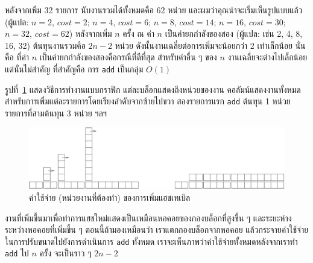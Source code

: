 หลังจากเพิ่ม 32 รายการ นับงานรวมได้ทั้งหมดคือ 62 หน่วย และผมว่าคุณน่าจะเริ่มเห็นรูปแบบแล้ว
(ผู้แปล: {\scriptsize$n = 2$}, {\scriptsize$cost = 2$};
 {\scriptsize$n = 4$}, {\scriptsize$cost = 6$};
 {\scriptsize$n = 8$}, {\scriptsize$cost = 14$};
 {\scriptsize$n = 16$}, {\scriptsize$cost = 30$};
 {\scriptsize$n = 32$}, {\scriptsize$cost = 62$})
หลังจากเพิ่ม {\scriptsize$n$} ครั้ง ณ ค่า {\scriptsize$n$} เป็นค่ายกกำลังของสอง (ผู้แปล: เช่น 2, 4, 8, 16, 32)
ต้นทุนงานรวมคือ {\scriptsize$2n-2$} หน่วย ดังนั้นงานเฉลี่ยต่อการเพิ่มจะน้อยกว่า 2 เท่าเล็กน้อย 
นั่นคือ ที่ค่า {\scriptsize$n$} เป็นค่ายกกำลังของสองคือกรณีที่ดีที่สุด 
สำหรับค่าอื่น ๆ ของ {\scriptsize$n$} งานเฉลี่ยจะต่างไปเล็กน้อย แต่นั่นไม่สำคัญ ที่สำคัญคือ การ {\tt add} เป็นกลุ่ม {\scriptsize$O(1)$}

รูปที่~\ref{fig.hash} แสดงวิธีการทำงานแบบกราฟิก แต่ละบล็อกแสดงถึงหน่วยของงาน 
คอลัมน์แสดงงานทั้งหมดสำหรับการเพิ่มแต่ละรายการโดยเรียงลำดับจากซ้ายไปขวา 
สองรายการแรก {\tt add} ต้นทุน 1 หน่วย รายการที่สามต้นทุน 3 หน่วย ฯลฯ

\begin{figure}
\centerline{\includegraphics[width=5.5in]{figs/towers.pdf}}
\caption{ค่าใช้จ่าย (หน่วยงานที่ต้องทำ) ของการเพิ่มแฮชเทเบิล}
\label{fig.hash}
\end{figure}

งานที่เพิ่มขึ้นมาเพื่อทำการแฮชใหม่แสดงเป็นเหมือนหอคอยของกองบล็อกที่สูงขึ้น ๆ 
และระยะห่างระหว่างหอคอยที่เพิ่มขึ้น ๆ
ตอนนี้ถ้ามองเหมือนว่า เราแตกกองบล็อกจากหอคอย แล้วกระจายค่าใช้จ่ายในการปรับขนาดไปยังการดำเนินการ \texttt{add} ทั้งหมด 
เราจะเห็นภาพว่าค่าใช้จ่ายทั้งหมดหลังจากเราทำ \texttt{add} ไป {\scriptsize$n$} ครั้ง จะเป็นราว ๆ {\scriptsize$2n - 2$}


